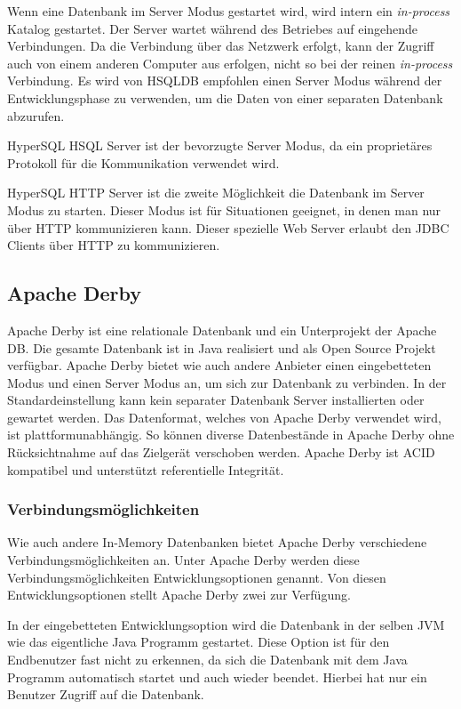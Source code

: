 \documentclass[draft,final]{vutinfth} %
\begin{document}
Wenn eine Datenbank im Server Modus gestartet wird, wird intern ein \textit{in-process} Katalog gestartet. Der Server wartet während des Betriebes auf eingehende Verbindungen. Da die Verbindung über das Netzwerk erfolgt, kann der Zugriff auch von einem anderen Computer aus erfolgen, nicht so bei der reinen \textit{in-process} Verbindung. Es wird von HSQLDB empfohlen einen Server Modus während der Entwicklungsphase zu verwenden, um die Daten von einer separaten Datenbank abzurufen.

HyperSQL HSQL Server ist der bevorzugte Server Modus, da ein proprietäres Protokoll für die Kommunikation verwendet wird.

HyperSQL HTTP Server ist die zweite Möglichkeit die Datenbank im Server Modus zu starten. Dieser Modus ist für Situationen geeignet, in denen man nur über HTTP kommunizieren kann. Dieser spezielle Web Server erlaubt den JDBC Clients über HTTP zu kommunizieren. 

\cite{HSQLGuide}

\subsection{Apache Derby}
Apache Derby ist eine relationale Datenbank und ein Unterprojekt der Apache DB. Die gesamte Datenbank ist in Java realisiert und als Open Source Projekt verfügbar. Apache Derby bietet wie auch andere Anbieter einen eingebetteten Modus und einen Server Modus an, um sich zur Datenbank zu verbinden. In der Standardeinstellung kann kein separater Datenbank Server installierten oder gewartet werden. Das Datenformat, welches von Apache Derby verwendet wird, ist plattformunabhängig. So können diverse Datenbestände in Apache Derby ohne Rücksichtnahme auf das Zielgerät verschoben werden. Apache Derby ist ACID kompatibel und unterstützt referentielle Integrität.

\subsubsection*{Verbindungsmöglichkeiten}
Wie auch andere In-Memory Datenbanken bietet Apache Derby verschiedene Verbindungsmöglichkeiten an. Unter Apache Derby werden diese Verbindungsmöglichkeiten Entwicklungsoptionen genannt. Von diesen Entwicklungsoptionen stellt Apache Derby zwei zur Verfügung. 

In der eingebetteten Entwicklungsoption wird die Datenbank in der selben JVM wie das eigentliche Java Programm gestartet. Diese Option ist für den Endbenutzer fast nicht zu erkennen, da sich die Datenbank mit dem Java Programm automatisch startet und auch wieder beendet. Hierbei hat nur ein Benutzer Zugriff auf die Datenbank.
\end{document}
